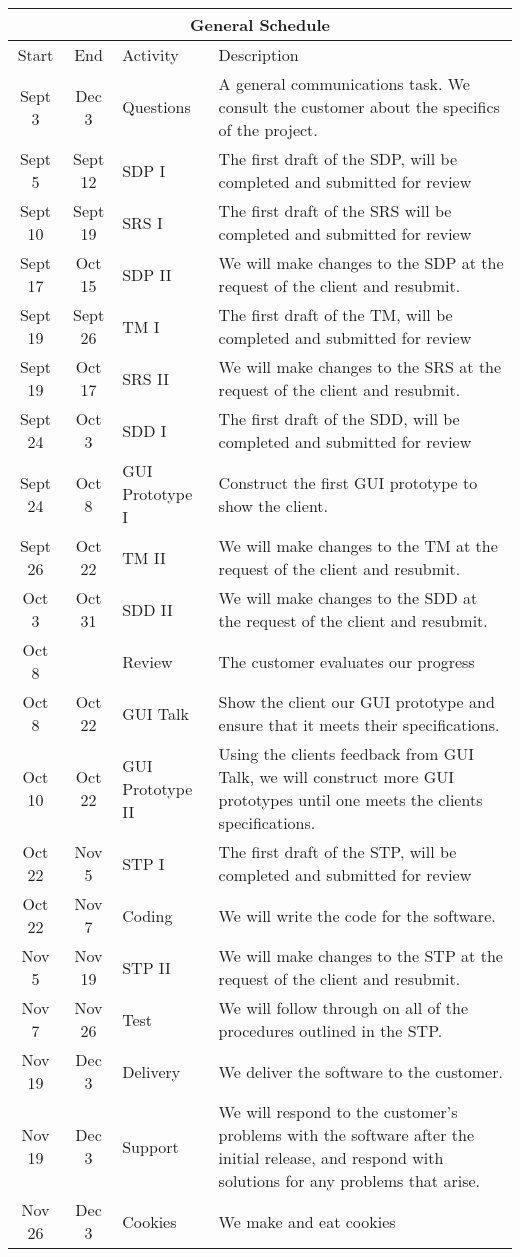 \documentclass{article}
\begin{document}
\begin{tabular}{|c|c|l|p{3.75in}|}
\hline
\multicolumn{4}{|c|}{ General Schedule}\\\hline
Start & End& Activity & Description \\\hline
Sept 3 & Dec 3 & Questions & A general communications task.  We consult the customer about the specifics of the project.\\\hline
Sept 5& Sept 12 & SDP I & The first draft of the SDP, will be completed and submitted for review\\\hline
Sept 10 & Sept 19 & SRS I & The first draft of the SRS will be completed and submitted for review\\\hline
Sept 17& Oct 15& SDP II & We will make changes to the SDP at the request of the client and resubmit.\\\hline
Sept 19& Sept 26 & TM I & The first draft of the TM, will be completed and submitted for review\\\hline
Sept 19& Oct 17& SRS II & We will make changes to the SRS at the request of the client and resubmit.\\\hline
Sept 24& Oct 3 & SDD I & The first draft of the SDD, will be completed and submitted for review\\\hline
Sept 24& Oct 8 & GUI Prototype I & Construct the first GUI prototype to show the client.\\\hline
Sept 26& Oct 22& TM II & We will make changes to the TM at the request of the client and resubmit.\\\hline
Oct 3& Oct 31& SDD II & We will make changes to the SDD at the request of the client and resubmit.\\\hline
Oct 8 & \null & Review & The customer evaluates our progress \\\hline
Oct 8 & Oct  22& GUI Talk & Show the client our GUI prototype and ensure that it meets their specifications. \\\hline
Oct 10 & Oct  22& GUI Prototype II  & Using the clients feedback from GUI Talk, we will construct more GUI prototypes until one meets the clients specifications.\\\hline
Oct 22& Nov 5 & STP I & The first draft of the STP, will be completed and submitted for review\\\hline
Oct 22 & Nov 7 & Coding & We will write the code for the software. \\\hline
Nov 5& Nov 19& STP II & We will make changes to the STP at the request of the client and resubmit.\\\hline
Nov 7 & Nov 26& Test& We will follow through on all of the procedures outlined in the STP.\\\hline
Nov 19& Dec 3& Delivery & We deliver the software to the customer.\\\hline
Nov 19& Dec 3& Support & We will respond to the customer's problems with the software after the initial release, and respond with solutions for any problems that arise. \\\hline
Nov 26 & Dec 3& Cookies & We make and eat cookies\\\hline
\end{tabular}
\end{document}
